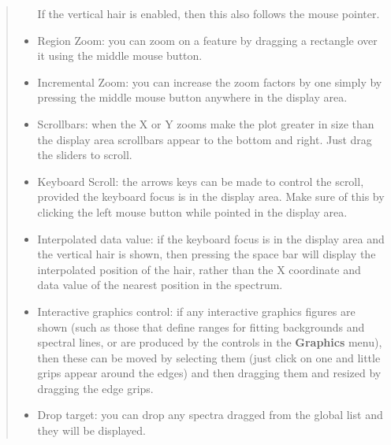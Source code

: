 \documentclass[twoside,11pt]{article}
\renewcommand{\_}{\texttt{\symbol{95}}}
\newcommand{\menuitem}[1]{\textbf{#1}}
\begin{document}
\begin{quote}
\begin{itemize}
  If the vertical hair is enabled, then this also follows the mouse
  pointer.

  \item Region Zoom: you can zoom on a feature by dragging a rectangle
  over it using the middle mouse button.

  \item Incremental Zoom: you can increase the zoom factors by one
  simply by pressing the middle mouse button anywhere in the display
  area.

  \item Scrollbars: when the X or Y zooms make the plot greater in size
  than the display area scrollbars appear to the bottom and right. Just
  drag the sliders to scroll.

  \item Keyboard Scroll: the arrows keys can be made to control the
  scroll, provided the keyboard focus is in the display area. Make sure
  of this by clicking the left mouse button while pointed in the display
  area.

  \item Interpolated data value: if the keyboard focus is in the
  display area and the vertical hair is shown, then pressing the space
  bar will display the interpolated position of the hair, rather than
  the X coordinate and data value of the nearest position in the
  spectrum.

  \item Interactive graphics control: if any interactive graphics figures are
  shown (such as those that define ranges for fitting backgrounds and spectral
  lines, or are produced by the controls in the \menuitem{Graphics} menu),
  then these can be moved by selecting them (just click on one and little
  grips appear around the edges) and then dragging them and resized by
  dragging the edge grips.

  \item Drop target: you can drop any spectra dragged from the global
  list and they will be displayed.

 \end{itemize}
\end{quote}
\end{document}
